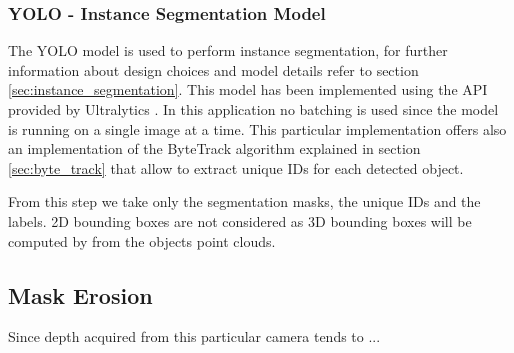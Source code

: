 \subsubsection[YOLO]{YOLO - Instance Segmentation Model}
The YOLO model is used to perform instance segmentation, for further information about design choices and model details refer to section \ref{sec:instance_segmentation}.
This model has been implemented using the API provided by Ultralytics \cite{ultralytics_yolo_2023}.
In this application no batching is used since the model is running on a single image at a time.
This particular implementation offers also an implementation of the ByteTrack algorithm explained in section \ref{sec:byte_track} that allow to extract unique IDs for each detected object.

From this step we take only the segmentation masks, the unique IDs and the labels. 2D bounding boxes are not considered as 3D bounding boxes will be computed by from the objects point clouds.
\subsection[Mask Erosion]{Mask Erosion}
Since depth acquired from this particular camera tends to ...
